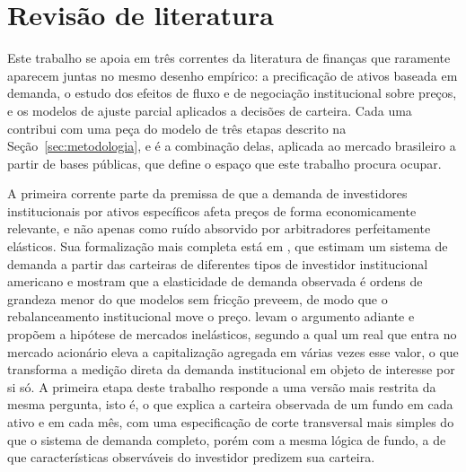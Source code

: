 \documentclass[12pt,a4paper]{article}
\begin{document}
\clearpage
\section{Revisão de literatura}
\label{sec:revisao}

Este trabalho se apoia em três correntes da literatura de finanças que raramente aparecem
juntas no mesmo desenho empírico: a precificação de ativos baseada em demanda, o estudo dos
efeitos de fluxo e de negociação institucional sobre preços, e os modelos de ajuste parcial
aplicados a decisões de carteira. Cada uma contribui com uma peça do modelo de três etapas
descrito na Seção~\ref{sec:metodologia}, e é a combinação delas, aplicada ao mercado
brasileiro a partir de bases públicas, que define o espaço que este trabalho procura ocupar.

A primeira corrente parte da premissa de que a demanda de investidores institucionais por
ativos específicos afeta preços de forma economicamente relevante, e não apenas como ruído
absorvido por arbitradores perfeitamente elásticos. Sua formalização mais completa está em
, que estimam um sistema de demanda a partir das carteiras de
diferentes tipos de investidor institucional americano e mostram que a elasticidade de
demanda observada é ordens de grandeza menor do que modelos sem fricção preveem, de modo que
o rebalanceamento institucional move o preço.  levam o argumento
adiante e propõem a hipótese de mercados inelásticos, segundo a qual um real que entra no
mercado acionário eleva a capitalização agregada em várias vezes esse valor, o que
transforma a medição direta da demanda institucional em objeto de interesse por si só. A
primeira etapa deste trabalho responde a uma versão mais restrita da mesma pergunta, isto é,
o que explica a carteira observada de um fundo em cada ativo e em cada mês, com uma
especificação de corte transversal mais simples do que o sistema de demanda completo, porém
com a mesma lógica de fundo, a de que características observáveis do investidor predizem sua
carteira.
\end{document}
